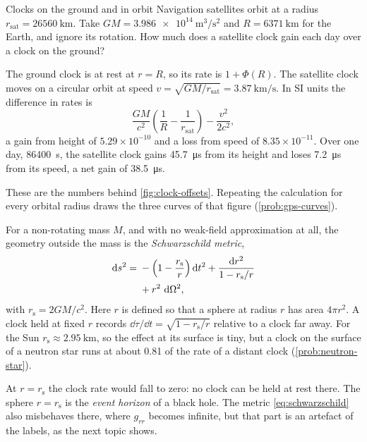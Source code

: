 \begin{example}[label=ex:gps, unbreakable]{Clocks on the ground and in orbit}
Navigation satellites orbit at a radius
$r_{\mathrm{sat}} = \SI{26560}{\kilo\metre}$. Take
$GM = \SI{3.986e14}{\metre\cubed\per\second\squared}$ and
$R = \SI{6371}{\kilo\metre}$ for the Earth, and ignore its rotation. How much
does a satellite clock gain each day over a clock on the ground?

\solution The ground clock is at rest at $r = R$, so its rate is $1 + \Phi(R)$.
The satellite clock moves on a circular orbit at speed
$v = \sqrt{GM/r_{\mathrm{sat}}} = \SI{3.87}{\kilo\metre\per\second}$. In SI
units the difference in rates is
\begin{equation*}
  \frac{GM}{c^{2}}\left(\frac{1}{R} - \frac{1}{r_{\mathrm{sat}}}\right)
  - \frac{v^{2}}{2c^{2}},
\end{equation*}
a gain from height of $5.29\times10^{-10}$ and a loss from speed of
$8.35\times10^{-11}$. Over one day, \SI{86400}{\second}, the satellite clock
gains \SI{45.7}{\micro\second} from its height and loses
\SI{7.2}{\micro\second} from its speed, a net gain of
\SI{38.5}{\micro\second}.

\discussion These are the numbers behind \cref{fig:clock-offsets}. Repeating
the calculation for every orbital radius draws the three curves of that
figure (\cref{prob:gps-curves}).
\end{example}

For a non-rotating mass $M$, and with no weak-field approximation at all, the
geometry outside the mass is the \emph{Schwarzschild metric},
\begin{equation}
  \begin{split}
  \mathop{}\!\mathrm{d} s^{2} = {}&-\Bigl(1 - \frac{r_{\mathrm{s}}}{r}\Bigr)\mathop{}\!\mathrm{d} t^{2}
  + \frac{\mathop{}\!\mathrm{d} r^{2}}{1 - r_{\mathrm{s}}/r}\\
  &+ r^{2}\,\mathop{}\!\mathrm{d}\Omega^{2},
  \end{split}
  \label{eq:schwarzschild}
\end{equation}
with $r_{\mathrm{s}} = 2GM/c^{2}$. Here $r$ is defined so that a sphere at
radius $r$ has area $4\pi r^{2}$. A clock held at fixed $r$ records
$\dd\tau/\dd t = \sqrt{1 - r_{\mathrm{s}}/r}$ relative to a clock far away. For
the Sun $r_{\mathrm{s}} \approx \SI{2.95}{\kilo\metre}$, so the effect at its
surface is tiny, but a clock on the surface of a neutron star runs at about
0.81 of the rate of a distant clock (\cref{prob:neutron-star}).

At $r = r_{\mathrm{s}}$ the clock rate would fall to zero: no clock can be held
at rest there. The sphere $r = r_{\mathrm{s}}$ is the \emph{event horizon} of a
black hole. The metric \cref{eq:schwarzschild} also misbehaves there, where
$g_{rr}$ becomes infinite, but that part is an artefact of the labels, as the
next topic shows.

